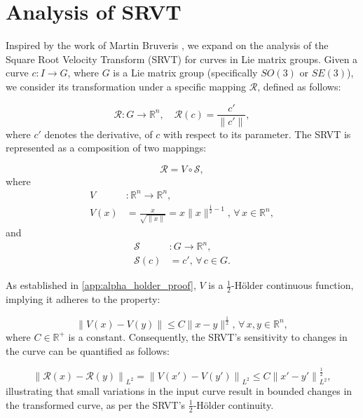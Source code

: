 \section{Analysis of SRVT}
\label{chap:analysis-SRVT}

Inspired by the work of Martin Bruveris \cite{bruverisOptimalReparametrizationsSquare2016}, we expand on the analysis of the Square Root Velocity Transform (SRVT) for curves in Lie matrix groups. Given a curve \(c: I \rightarrow G\), where \(G\) is a Lie matrix group (specifically \(SO(3)\) or \(SE(3)\)), we consider its transformation under a specific mapping \(\mathcal{R}\), defined as follows:

\begin{equation}
    \mathcal{R}: G \rightarrow \mathbb{R}^n, \quad \mathcal{R}(c) = \frac{c'}{\|c'\|},
\end{equation}
where \(c'\) denotes the derivative, of \(c\) with respect to its parameter. The SRVT is represented as a composition of two mappings:

\begin{equation}
    \mathcal{R} = V \circ \mathcal{S},
\end{equation}
where
\begin{equation}
\begin{aligned}
V &: \mathbb{R}^n \rightarrow \mathbb{R}^n, \\
V(x) &= \frac{x}{\sqrt{\|x\|}} = x \|x\|^{\frac{1}{2} - 1}, \, \forall \, x \in \mathbb{R}^n,
\end{aligned}
\end{equation}
and
\begin{equation}
\begin{aligned}
    \mathcal{S} &: G \rightarrow \mathbb{R}^n, \\
    \mathcal{S}(c) &= c', \, \forall \, c \in G.
\end{aligned}
\end{equation}

As established in \ref{app:alpha_holder_proof}, \(V\) is a \(\frac{1}{2}\)-Hölder continuous function, implying it adheres to the property:

\begin{equation}
    \|V(x) - V(y)\| \leq C \|x - y\|^{\frac{1}{2}}, \, \forall \, x, y \in \mathbb{R}^n,
\end{equation}
where \(C \in \mathbb{R}^+\) is a constant. Consequently, the SRVT's sensitivity to changes in the curve can be quantified as follows:

\begin{equation}
    \left\| \mathcal{R}(x) - \mathcal{R}(y) \right\|_{L^2} = \left\| V(x') - V(y') \right\|_{L^2} \leq C \left\| x' - y' \right\|^{\frac{1}{2}}_{L^2},
\end{equation}
illustrating that small variations in the input curve result in bounded changes in the transformed curve, as per the SRVT's \(\frac{1}{2}\)-Hölder continuity.

